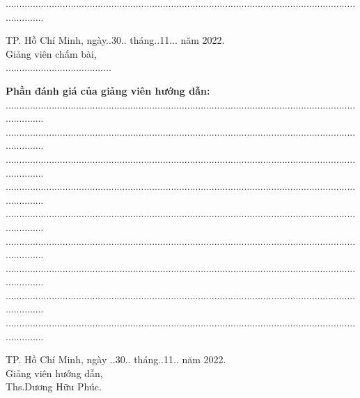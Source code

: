 \documentclass[12pt,a4paper,2sides]{report}
\newcommand{\gvhd}{Ths.Dương Hữu Phúc} %
\newcommand{\nam}{2022}
\begin{document}
	...............................................................................................................................................
\begin{center}
	\hspace*{5cm} TP. Hồ Chí Minh, ngày..30.. tháng..11... năm \nam.\\
	\hspace*{5cm} Giảng viên chấm bài,\\
	\vspace*{1.2cm}
	\hspace*{5cm} .......................................
\end{center}
	\vspace*{0.5cm}
	\textbf{Phần đánh giá của giảng viên hướng dẫn:}\\
	...............................................................................................................................................\\
	...............................................................................................................................................\\
	...............................................................................................................................................\\
	...............................................................................................................................................\\
	...............................................................................................................................................\\
	...............................................................................................................................................\\
	...............................................................................................................................................\\
	...............................................................................................................................................\\
	...............................................................................................................................................
\begin{center}
	\hspace*{5cm} TP. Hồ Chí Minh, ngày ..30.. tháng..11.. năm \nam.\\
	\hspace*{5cm} Giảng viên hướng dẫn,\\
	\vspace*{2cm}
	\hspace*{5cm} \gvhd.
\newpage
\end{center}
\end{document}
